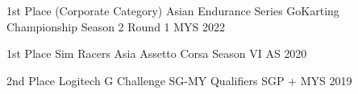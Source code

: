 



\begin{cvhonors}

  \cvhonor
    {1st Place (Corporate Category)} %
    {Asian Endurance Series GoKarting Championship Season 2 Round 1} %
    {MYS} %
    {2022} %
  
  
  \cvhonor
    {1st Place} %
    {Sim Racers Asia Assetto Corsa Season VI} %
    {AS} %
    {2020} %

  \cvhonor
    {2nd Place} %
    {Logitech G Challenge SG-MY Qualifiers} %
    {SGP + MYS} %
    {2019} %
  

\end{cvhonors}
